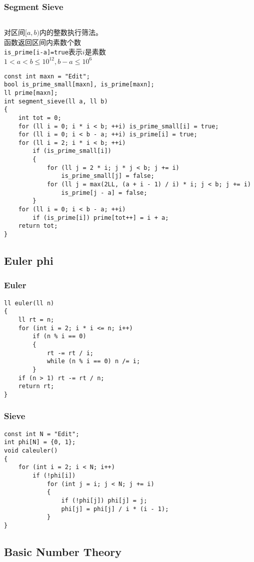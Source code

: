 \documentclass[twoside]{article}
\begin{document}
\subsubsection{Segment Sieve}
\begin{lstlisting}
\end{lstlisting}
对区间$[a,b)$内的整数执行筛法。\\
函数返回区间内素数个数\\
\texttt{is\_prime[i-a]=true}表示$i$是素数\\
$1<a<b \le 10^{12}, b-a \le 10^6$
\begin{lstlisting}
const int maxn = "Edit";
bool is_prime_small[maxn], is_prime[maxn];
ll prime[maxn];
int segment_sieve(ll a, ll b)
{
    int tot = 0;
    for (ll i = 0; i * i < b; ++i) is_prime_small[i] = true;
    for (ll i = 0; i < b - a; ++i) is_prime[i] = true;
    for (ll i = 2; i * i < b; ++i)
        if (is_prime_small[i])
        {
            for (ll j = 2 * i; j * j < b; j += i)
                is_prime_small[j] = false;
            for (ll j = max(2LL, (a + i - 1) / i) * i; j < b; j += i)
                is_prime[j - a] = false;
        }
    for (ll i = 0; i < b - a; ++i)
        if (is_prime[i]) prime[tot++] = i + a;
    return tot;
}
\end{lstlisting}
\subsection{Euler phi}
\subsubsection{Euler}
\begin{lstlisting}
ll euler(ll n)
{
    ll rt = n;
    for (int i = 2; i * i <= n; i++)
        if (n % i == 0)
        {
            rt -= rt / i;
            while (n % i == 0) n /= i;
        }
    if (n > 1) rt -= rt / n;
    return rt;
}
\end{lstlisting}
\subsubsection{Sieve}
\begin{lstlisting}
const int N = "Edit";
int phi[N] = {0, 1};
void caleuler()
{
    for (int i = 2; i < N; i++)
        if (!phi[i])
            for (int j = i; j < N; j += i)
            {
                if (!phi[j]) phi[j] = j;
                phi[j] = phi[j] / i * (i - 1);
            }
}
\end{lstlisting}
\subsection{Basic Number Theory}
\end{document}
